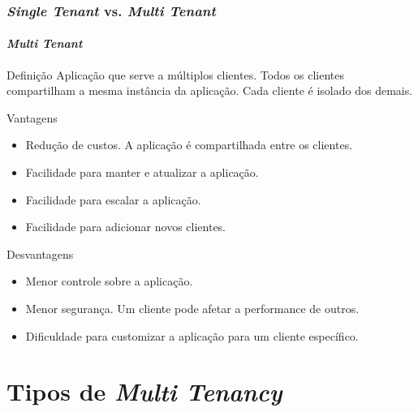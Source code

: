 \documentclass[
	9pt, %
	t, %
]{beamer}
\begin{document}
\begin{frame}
	\frametitle{\textit{Single Tenant} vs. \textit{Multi Tenant}}
	\framesubtitle{\textit{Multi Tenant}}

	\begin{block}{Definição}
		Aplicação que serve a múltiplos clientes. Todos os clientes compartilham a mesma instância da aplicação. Cada cliente é isolado dos demais.
	\end{block}

	\begin{exampleblock}{Vantagens}
		\begin{itemize}
			\item Redução de custos. A aplicação é compartilhada entre os clientes.
			\item Facilidade para manter e atualizar a aplicação.
			\item Facilidade para escalar a aplicação.
			\item Facilidade para adicionar novos clientes.
		\end{itemize}
	\end{exampleblock}

	\begin{alertblock}{Desvantagens}
		\begin{itemize}
			\item Menor controle sobre a aplicação.
			\item Menor segurança. Um cliente pode afetar a performance de outros.
			\item Dificuldade para customizar a aplicação para um cliente específico.
		\end{itemize}
	\end{alertblock}

\end{frame}

\section{Tipos de \textit{Multi Tenancy}}
\end{document}

